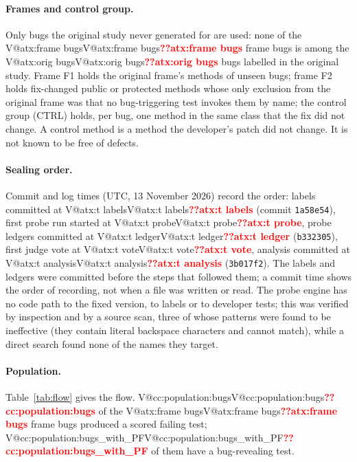 \documentclass[pdflatex,iicol,sn-mathphys-num]{sn-jnl}
\makeatletter
\newcommand{\V}[1]{\ifcsname V@#1\endcsname\csname V@#1\endcsname\else\textbf{\textcolor{red}{??#1}}\fi}
\makeatother
\begin{document}
\paragraph{Frames and control group.} Only bugs the original study never generated for are used: none of the \V{atx:frame bugs} frame bugs is among the \V{atx:orig bugs} bugs labelled in the original study. Frame F1 holds the original frame's methods of unseen bugs; frame F2 holds fix-changed public or protected methods whose only exclusion from the original frame was that no bug-triggering test invokes them by name; the control group (CTRL) holds, per bug, one method in the same class that the fix did not change. A control method is a method the developer's patch did not change. It is not known to be free of defects.

\paragraph{Sealing order.} Commit and log times (UTC, 13 November 2026) record the order: labels committed at \V{atx:t labels} (commit \texttt{1a58e54}), first probe run started at \V{atx:t probe}, probe ledgers committed at \V{atx:t ledger} (\texttt{b332305}), first judge vote at \V{atx:t vote}, analysis committed at \V{atx:t analysis} (\texttt{3b017f2}). The labels and ledgers were committed before the steps that followed them; a commit time shows the order of recording, not when a file was written or read. The probe engine has no code path to the fixed version, to labels or to developer tests; this was verified by inspection and by a source scan, three of whose patterns were found to be ineffective (they contain literal backspace characters and cannot match), while a direct search found none of the names they target.

\paragraph{Population.} Table~\ref{tab:flow} gives the flow. \V{cc:population:bugs} of the \V{atx:frame bugs} frame bugs produced a scored failing test; \V{cc:population:bugs_with_PF} of them have a bug-revealing test.
\end{document}
